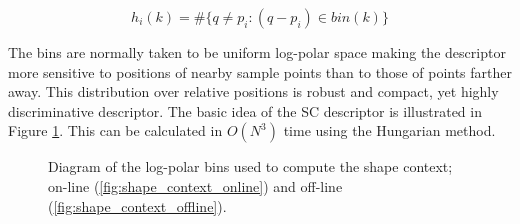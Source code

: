 \begin{equation}
{h_i}(k) = \# \{q \ne p_i:(q - p_i) \in bin(k) \}
\label{eq:sc_bins}
\end{equation}

The bins are normally taken to be uniform log-polar space making the descriptor more sensitive to positions of nearby sample points than to those of points farther away. 
This distribution over relative positions is robust and compact, yet highly discriminative descriptor. 
The basic idea of the SC descriptor is illustrated in Figure \ref{fig:shape_context_demo}. This can be calculated in $O(N^3)$ time using the Hungarian method.

\begin{figure}
\centering
{}
\caption{Diagram of the log-polar bins used to compute the shape context; on-line (\ref{fig:shape_context_online}) and off-line (\ref{fig:shape_context_offline}).}
\label{fig:shape_context_demo}
\end{figure}

